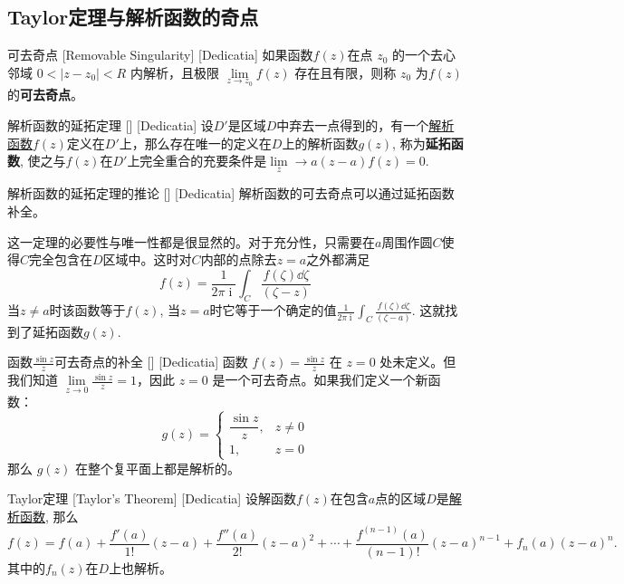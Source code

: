 \documentclass[UTF8]{ctexart}
\DeclareMathOperator{\ii}{\mathrm{i}}
\newcommand{\AnalyticalFunction}{\hyperref[dfn:AnalyticalFunction]{解析函数}}
\begin{document}
\subsection{Taylor定理与解析函数的奇点}
\begin{dfn}
    [UUID]
    {可去奇点}
    [Removable Singularity]
    [Dedicatia]
    如果函数\( f(z) \)在点 \( z_0 \) 的一个去心邻域 \( 0 < |z - z_0| < R \) 内解析，且极限 \( \lim\limits_{z \to z_0} f(z) \) 存在且有限，则称 \( z_0 \) 为\( f(z) \)的\textbf{可去奇点}。
\end{dfn}
\begin{thm}
    [UUID]
    {解析函数的延拓定理}
    []
    [Dedicatia]
    设$D'$是区域$D$中弃去一点得到的，有一个\AnalyticalFunction $f(z)$定义在$D'$上，那么存在唯一的定义在$D$上的解析函数$g(z)$, 称为\textbf{延拓函数}, 使之与$f(z)$在$D'$上完全重合的充要条件是$\lim\limits_z\to a(z-a)f(z)=0$.
\end{thm}
\begin{crl}
    [UUID]
    {解析函数的延拓定理的推论}
    []
    [Dedicatia]
    解析函数的可去奇点可以通过延拓函数补全。
\end{crl}
\begin{prf}
    这一定理的必要性与唯一性都是很显然的。对于充分性，只需要在$a$周围作圆$C$使得$C$完全包含在$D$区域中。这时对$C$内部的点除去$z=a$之外都满足
    \[f(z)=\frac{1}{2\pi\ii}\int_C \frac{f(\zeta)\dd{\zeta}}{(\zeta-z)}\]
    当$z\neq a$时该函数等于$f(z)$, 当$z=a$时它等于一个确定的值$\frac{1}{2\pi\ii}\int_C \frac{f(\zeta)\dd{\zeta}}{(\zeta-a)}$. 这就找到了延拓函数$g(z)$.
\end{prf}
\begin{xmp}
    [UUID]
    {函数$\frac{\sin z}{z}$可去奇点的补全}
    []
    [Dedicatia]
    函数 \( f(z) = \frac{\sin z}{z} \) 在 \( z = 0 \) 处未定义。但我们知道 \( \lim\limits_{z \to 0} \frac{\sin z}{z} = 1 \)，因此 \( z=0 \) 是一个可去奇点。如果我们定义一个新函数：
    \[
    g(z) = \begin{cases}
    \dfrac{\sin z}{z}, & z \neq 0 \\
    1, & z = 0
    \end{cases}
    \]
    那么 \( g(z) \) 在整个复平面上都是解析的。
\end{xmp}
\begin{thm}
    [UUID]
    {Taylor定理\label{thm:Taylor}}
    [Taylor's Theorem]
    [Dedicatia]
    设解函数$f(z)$在包含$a$点的区域$D$是\AnalyticalFunction , 那么
    \[f(z)=f(a)+\frac{f'(a)}{1!}(z-a)+\frac{f''(a)}{2!}(z-a)^2+\cdots+\frac{f^{(n-1)}(a)}{(n-1)!}(z-a)^{n-1}+f_n(a)(z-a)^n.\]
    其中的$f_n(z)$在$D$上也解析。
\end{thm}
\end{document}
